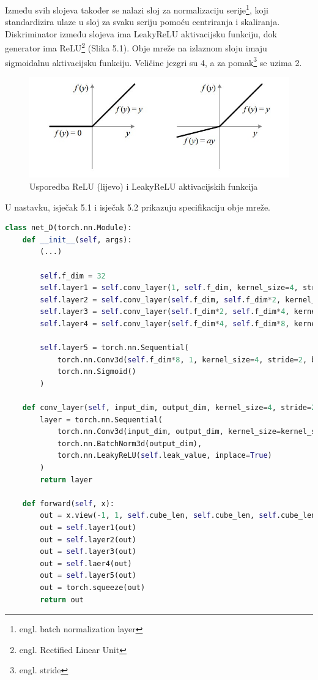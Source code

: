 \documentclass[times, utf8, diplomski]{fer}
\begin{document}
Između svih slojeva također se nalazi sloj za normalizaciju serije\footnote{engl. batch normalization layer}, koji standardizira ulaze u sloj za svaku seriju pomoću centriranja i skaliranja. Diskriminator između slojeva ima LeakyReLU aktivacijsku funkciju, dok generator ima ReLU\footnote{engl. Rectified Linear Unit} (Slika 5.1). Obje mreže na izlaznom sloju imaju sigmoidalnu aktivacijsku funkciju. Veličine jezgri su 4, a za pomak\footnote{engl. stride} se uzima 2.

\begin{figure}[h]
\centering
\includegraphics[scale=0.58]{relu-vs-leaky.jpeg}
\caption{Usporedba ReLU (lijevo) i LeakyReLU aktivacijskih funkcija \cite{ReLU}}
\end{figure}

U nastavku, isječak 5.1 i isječak 5.2 prikazuju specifikaciju obje mreže.

\break

\begin{lstlisting}[language=Python, caption=Modificirani 3DGAN model diskriminatora]
class net_D(torch.nn.Module):
    def __init__(self, args):
        (...)

        self.f_dim = 32
        self.layer1 = self.conv_layer(1, self.f_dim, kernel_size=4, stride=2, padding=(1,1,1), bias=self.bias)
        self.layer2 = self.conv_layer(self.f_dim, self.f_dim*2, kernel_size=4, stride=2, padding=(1,1,1), bias=self.bias)
        self.layer3 = self.conv_layer(self.f_dim*2, self.f_dim*4, kernel_size=4, stride=2, padding=(1,1,1), bias=self.bias)
        self.layer4 = self.conv_layer(self.f_dim*4, self.f_dim*8, kernel_size=4, stride=2, padding=(1,1,1), bias=self.bias)

        self.layer5 = torch.nn.Sequential(
            torch.nn.Conv3d(self.f_dim*8, 1, kernel_size=4, stride=2, bias=self.bias, padding=padd),
            torch.nn.Sigmoid()
        )

    def conv_layer(self, input_dim, output_dim, kernel_size=4, stride=2, padding=(1,1,1), bias=False):
        layer = torch.nn.Sequential(
            torch.nn.Conv3d(input_dim, output_dim, kernel_size=kernel_size, stride=stride, bias=bias, padding=padding),
            torch.nn.BatchNorm3d(output_dim),
            torch.nn.LeakyReLU(self.leak_value, inplace=True)
        )
        return layer

    def forward(self, x):
        out = x.view(-1, 1, self.cube_len, self.cube_len, self.cube_len)
        out = self.layer1(out)
        out = self.layer2(out)
        out = self.layer3(out)
        out = self.laer4(out)
        out = self.layer5(out)
        out = torch.squeeze(out)
        return out

\end{lstlisting}
\end{document}
